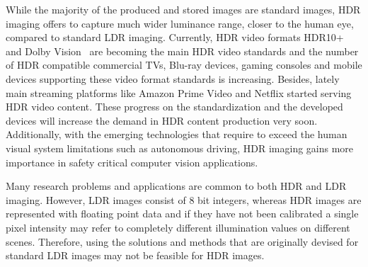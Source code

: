 While the majority of the produced and stored images are standard images, HDR imaging offers to capture much wider luminance range, closer to the human eye, compared to standard LDR imaging. Currently, HDR video formats HDR10+~\cite{HDR10+} and Dolby Vision~\cite{chinnock2016dolby} are becoming the main HDR video standards and the number of HDR compatible commercial TVs, Blu-ray devices, gaming consoles and mobile devices supporting these video format standards is increasing. Besides, lately main streaming platforms like Amazon Prime Video and Netflix started serving HDR video content. These progress on the standardization and the developed devices will increase the demand in HDR content production very soon. Additionally, with the emerging technologies that require to exceed the human visual system limitations such as autonomous driving, HDR imaging gains more importance in safety critical computer vision applications.


Many research problems and applications are common to both HDR and LDR imaging. However, LDR images consist of 8 bit integers, whereas HDR images are represented with floating point data and if they have not been calibrated a single pixel intensity may refer to completely different illumination values on different scenes. Therefore, using the solutions and methods that are originally devised for standard LDR images may not be feasible for HDR images. 


